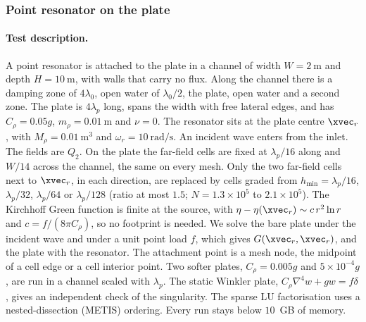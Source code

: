 {\color{red}
\subsubsection{Point resonator on the plate}\label{subsubsec:num_L3_2}

\paragraph{Test description.} A point resonator is attached to the plate in a channel of width $W=2~\si{\meter}$ and depth $H=10~\si{\meter}$, with walls that carry no flux. Along the channel there is a damping zone of $4\lambda_0$, open water of $\lambda_0/2$, the plate, open water and a second zone. The plate is $4\lambda_p$ long, spans the width with free lateral edges, and has $C_\rho=0.05g$, $m_\rho=0.01~\si{\meter}$ and $\nu=0$. The resonator sits at the plate centre $\xvec_r$, with $M_\rho=0.01~\si{\meter\cubed}$ and $\omega_r=10~\si{\radian\per\second}$. An incident wave enters from the inlet. The fields are $Q_2$. On the plate the far-field cells are fixed at $\lambda_p/16$ along and $W/14$ across the channel, the same on every mesh. Only the two far-field cells next to $\xvec_r$, in each direction, are replaced by cells graded from $h_\mathrm{min}=\lambda_p/16$, $\lambda_p/32$, $\lambda_p/64$ or $\lambda_p/128$ (ratio at most $1.5$; $N=1.3\times10^5$ to $2.1\times10^5$). The Kirchhoff Green function is finite at the source, with $\eta-\eta(\xvec_r)\sim c\,r^2\ln r$ and $c=f/(8\pi C_\rho)$, so no footprint is needed. We solve the bare plate under the incident wave and under a unit point load $f$, which gives $G(\xvec_r,\xvec_r)$, and the plate with the resonator. The attachment point is a mesh node, the midpoint of a cell edge or a cell interior point. Two softer plates, $C_\rho=0.005g$ and $5\times10^{-4}g$, are run in a channel scaled with $\lambda_p$. The static Winkler plate, $C_\rho\nabla^4w+gw=f\delta$, gives an independent check of the singularity. The sparse LU factorisation uses a nested-dissection (METIS) ordering. Every run stays below $10$~GB of memory.

}
